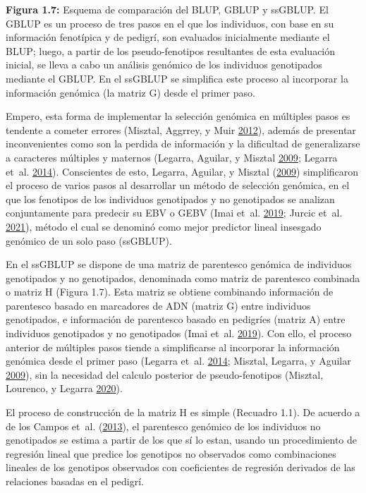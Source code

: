 \documentclass[11pt,spanish,a4paper,oneside,]{book} %
\begin{document}
\begin{center}
\textbf{Figura 1.7:} Esquema de comparación del BLUP, GBLUP y ssGBLUP. El GBLUP es un proceso de tres pasos en el que los individuos, con base en su información fenotípica y de pedigrí, son evaluados inicialmente mediante el BLUP; luego, a partir de los pseudo-fenotipos resultantes de esta evaluación inicial, se lleva a cabo un análisis genómico de los individuos genotipados mediante el GBLUP. En el ssGBLUP se simplifica este proceso al incorporar la información genómica (la matriz G) desde el primer paso.

\end{center}

Empero, esta forma de implementar la selección genómica en múltiples pasos es tendente a cometer errores (Misztal, Aggrrey, y Muir \protect\hyperlink{ref-cite:14}{2012}), además de presentar inconvenientes como son la perdida de información y la dificultad de generalizarse a caracteres múltiples y maternos (Legarra, Aguilar, y Misztal \protect\hyperlink{ref-cite:17}{2009}; Legarra et~al. \protect\hyperlink{ref-cite:15}{2014}). Conscientes de esto, Legarra, Aguilar, y Misztal (\protect\hyperlink{ref-cite:17}{2009}) simplificaron el proceso de varios pasos al desarrollar un método de selección genómica, en el que los fenotipos de los individuos genotipados y no genotipados se analizan conjuntamente para predecir su EBV o GEBV (Imai et~al. \protect\hyperlink{ref-cite:20}{2019}; Jurcic et~al. \protect\hyperlink{ref-cite:11}{2021}), método el cual se denominó como mejor predictor lineal insesgado genómico de un solo paso (ssGBLUP).

En el ssGBLUP se dispone de una matriz de parentesco genómica de individuos genotipados y no genotipados, denominada como matriz de parentesco combinada o matriz H (Figura 1.7). Esta matriz se obtiene combinando información de parentesco basado en marcadores de ADN (matriz G) entre individuos genotipados, e información de parentesco basado en pedigríes (matriz A) entre individuos genotipados y no genotipados (Imai et~al. \protect\hyperlink{ref-cite:20}{2019}). Con ello, el proceso anterior de múltiples pasos tiende a simplificarse al incorporar la información genómica desde el primer paso (Legarra et~al. \protect\hyperlink{ref-cite:15}{2014}; Misztal, Legarra, y Aguilar \protect\hyperlink{ref-cite:16}{2009}), sin la necesidad del calculo posterior de pseudo-fenotipos (Misztal, Lourenco, y Legarra \protect\hyperlink{ref-cite:18}{2020}).

El proceso de construcción de la matriz H es simple (Recuadro 1.1). De acuerdo a de los Campos et~al. (\protect\hyperlink{ref-cite:31}{2013}), el parentesco genómico de los individuos no genotipados se estima a partir de los que sí lo estan, usando un procedimiento de regresión lineal que predice los genotipos no observados como combinaciones lineales de los genotipos observados con coeficientes de regresión derivados de las relaciones basadas en el pedigrí.
\end{document}
